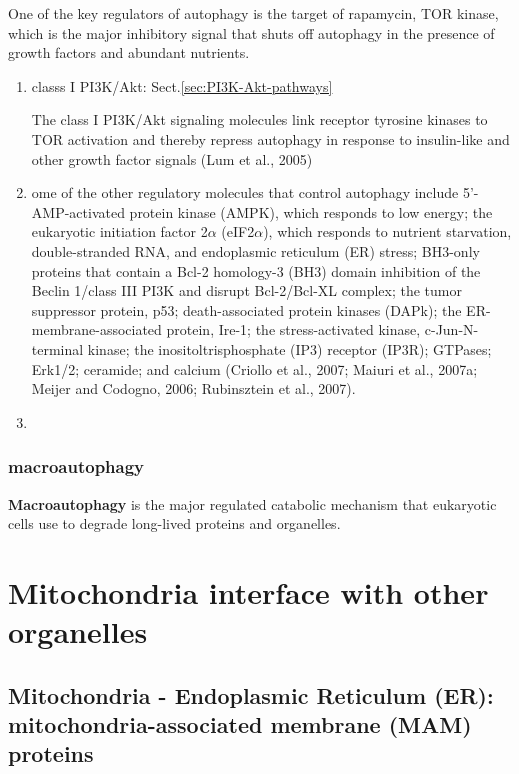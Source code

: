 One of the key regulators of autophagy is the target of rapamycin, TOR kinase,
which is the major inhibitory signal that shuts off autophagy in the presence of
growth factors and abundant nutrients.
\begin{enumerate}
  \item classs I PI3K/Akt: Sect.\ref{sec:PI3K-Akt-pathways}

The class I PI3K/Akt signaling molecules link receptor tyrosine kinases to TOR
activation and thereby repress autophagy in response to insulin-like and other
growth factor signals (Lum et al., 2005)

  \item ome of the other regulatory molecules that control autophagy include
  5'-AMP-activated protein kinase (AMPK), which responds to low energy; the
  eukaryotic initiation factor 2$\alpha$ (eIF2$\alpha$), which responds to
  nutrient starvation, double-stranded RNA, and endoplasmic reticulum (ER) stress;
  BH3-only proteins that contain a Bcl-2 homology-3 (BH3) domain inhibition of
  the Beclin 1/class III PI3K and disrupt Bcl-2/Bcl-XL complex; the tumor
  suppressor protein, p53; death-associated protein kinases (DAPk); the
  ER-membrane-associated protein, Ire-1; the stress-activated kinase,
  c-Jun-N-terminal kinase; the inositoltrisphosphate (IP3) receptor (IP3R);
  GTPases; Erk1/2; ceramide; and calcium (Criollo et al., 2007; Maiuri et al.,
  2007a; Meijer and Codogno, 2006; Rubinsztein et al., 2007).
  \item
\end{enumerate}

\subsection{macroautophagy}
\label{sec:macroautophagy}

{\bf Macroautophagy} is the major
regulated catabolic mechanism that eukaryotic cells use to degrade long-lived
proteins and organelles.

\chapter{Mitochondria interface with other organelles}



\section{Mitochondria - Endoplasmic Reticulum (ER): mitochondria-associated membrane (MAM) proteins}
\label{sec:MAM-protein}
\label{sec:mito-ER-interface}

